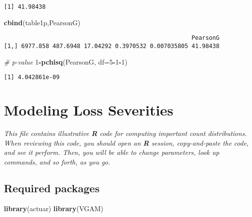 \documentclass[]{book}
\newenvironment{Shaded}{\begin{snugshade}}{\end{snugshade}}
\newcommand{\KeywordTok}[1]{\textcolor[rgb]{0.13,0.29,0.53}{\textbf{#1}}}
\newcommand{\DataTypeTok}[1]{\textcolor[rgb]{0.13,0.29,0.53}{#1}}
\newcommand{\DecValTok}[1]{\textcolor[rgb]{0.00,0.00,0.81}{#1}}
\newcommand{\CommentTok}[1]{\textcolor[rgb]{0.56,0.35,0.01}{\textit{#1}}}
\newcommand{\OperatorTok}[1]{\textcolor[rgb]{0.81,0.36,0.00}{\textbf{#1}}}
\newcommand{\NormalTok}[1]{#1}
\theoremstyle{definition}
\theoremstyle{definition}
\theoremstyle{definition}
\theoremstyle{remark}
\begin{document}
\begin{verbatim}
[1] 41.98438
\end{verbatim}

\begin{Shaded}
\begin{Highlighting}[]
\KeywordTok{cbind}\NormalTok{(table1p,PearsonG)}
\end{Highlighting}
\end{Shaded}

\begin{verbatim}
                                                      PearsonG
[1,] 6977.858 487.6948 17.04292 0.3970532 0.007035805 41.98438
\end{verbatim}

\begin{Shaded}
\begin{Highlighting}[]
\CommentTok{#  p-value}
\DecValTok{1}\OperatorTok{-}\KeywordTok{pchisq}\NormalTok{(PearsonG, }\DataTypeTok{df=}\DecValTok{5}\OperatorTok{-}\DecValTok{1}\OperatorTok{-}\DecValTok{1}\NormalTok{)}
\end{Highlighting}
\end{Shaded}

\begin{verbatim}
[1] 4.042861e-09
\end{verbatim}

\chapter{Modeling Loss Severities}\label{modeling-loss-severities}

\emph{This file contains illustrative \textbf{R} code for computing
important count distributions. When reviewing this code, you should open
an \textbf{R} session, copy-and-paste the code, and see it perform.
Then, you will be able to change parameters, look up commands, and so
forth, as you go. }

\section{Required packages}\label{required-packages}

\begin{Shaded}
\begin{Highlighting}[]
\KeywordTok{library}\NormalTok{(actuar)}
\KeywordTok{library}\NormalTok{(VGAM)}
\end{Highlighting}
\end{Shaded}
\end{document}
